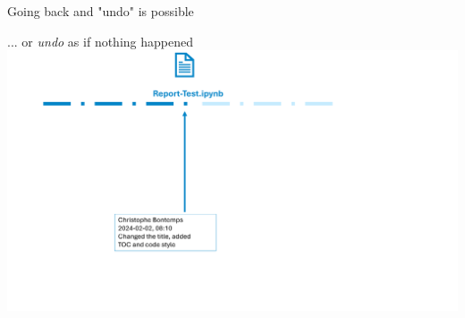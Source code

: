 \documentclass[xcolor=x11names,compress]{beamer}
\renewcommand{\(}{\begin{columns}}
\renewcommand{\)}{\end{columns}}
\newcommand{\<}[1]{\begin{column}{#1}}
\renewcommand{\>}{\end{column}}
\begin{document}
\begin{frame}{Going back and "undo" is possible}
\begin{center}
\begin{itemize}
    {... or \emph{undo} as if nothing happened }
    {\includegraphics[width = 1.0\textwidth]{FileLifeRevert2.png} \\ }

\end{itemize}
\end{center}
\end{frame}
\end{document}
